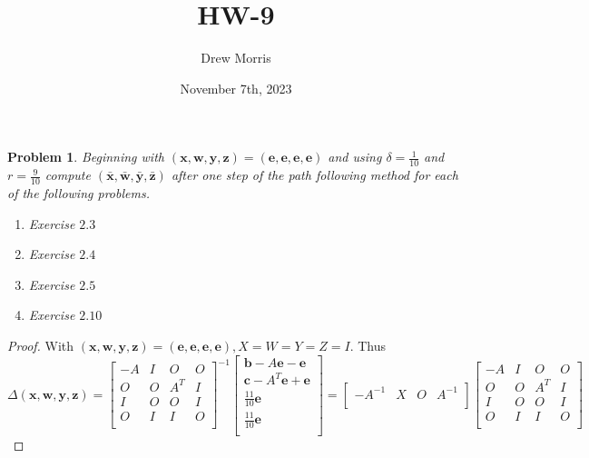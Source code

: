 \documentclass[12pt,oneside]{amsart}
\title{HW-9}
\author{Drew Morris}
\date{November 7th, 2023}
\numberwithin{equation}{section}
\numberwithin{figure}{section}
\theoremstyle{plain}
\newtheorem{prob}{Problem}
\theoremstyle{definition}
\begin{document}
\maketitle

\begin{prob}
  Beginning with $(\mathbf{x},\mathbf{w},\mathbf{y},\mathbf{z}) = (\mathbf{e},
  \mathbf{e},\mathbf{e},\mathbf{e})$ and using $\delta = \frac{1}{10}$ and $r = 
  \frac{9}{10}$ compute $(\bar{\mathbf{x}},\bar{\mathbf{w}},\bar{\mathbf{y}},
  \bar{\mathbf{z}})$ after one step of the path following method for each of the 
  following problems. \\
  \begin{enumerate}
    \item Exercise $2.3$ \\
    \item Exercise $2.4$ \\
    \item Exercise $2.5$ \\
    \item Exercise $2.10$ \\
  \end{enumerate}
\end{prob}
\begin{proof}
With $(\mathbf{x},\mathbf{w},\mathbf{y},\mathbf{z}) = (\mathbf{e},
\mathbf{e},\mathbf{e},\mathbf{e}), X=W=Y=Z=I$. Thus $\Delta(\mathbf{x},\mathbf{w},
\mathbf{y},\mathbf{z}) = \begin{bmatrix}
  -A & I & O & O \\
  O & O & A^T & I \\
  I & O & O & I \\
  O & I & I & O \\
  \end{bmatrix}^{-1}\begin{bmatrix}
  \mathbf{b} - A\mathbf{e} - \mathbf{e} \\
  \mathbf{c} - A^T\mathbf{e} + \mathbf{e} \\
  \frac{11}{10}\mathbf{e} \\
  \frac{11}{10}\mathbf{e} \\
\end{bmatrix} = \begin{bmatrix}
  -A^{-1} & X & O & A^{-1} \\
   
\end{bmatrix}\begin{bmatrix}
  -A & I & O & O \\
  O & O & A^T & I \\
  I & O & O & I \\
  O & I & I & O \\
  \end{bmatrix}$
\end{proof}
\end{document}
